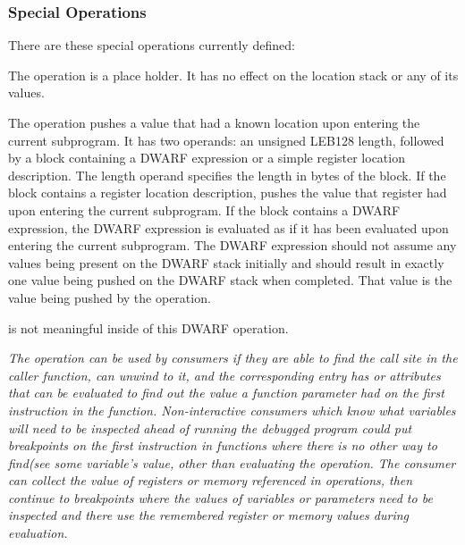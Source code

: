 \subsubsection{Special Operations}
\label{chap:specialoperations}
There 
are these special operations currently defined:
\begin{enumerate}[1. ]
\itembfnl{\DWOPnopNAME}
The \DWOPnopTARG{} operation is a place holder. It has no effect
on the location stack or any of its values.

\itembfnl{\DWOPentryvalueNAME}
The \DWOPentryvalueTARG{} operation pushes a value that had a known location
upon entering the current subprogram.  It has two operands: an 
unsigned LEB128 length, followed by 
a block containing a DWARF expression or
a simple register location description.  The length operand specifies the length
in bytes of the block.  If the block contains a register location
description, \DWOPentryvalueNAME{} pushes the value that register had upon
entering the current subprogram.  If the block contains a DWARF expression,
the DWARF expression is evaluated as if it has been evaluated upon entering
the current subprogram.  The DWARF expression should not assume any values
being present on the DWARF stack initially and should result in exactly one
value being pushed on the DWARF stack when completed.  That value is the value
being pushed by the \DWOPentryvalueNAME{} operation.  

\DWOPpushobjectaddress{} is not meaningful inside of this DWARF operation.

\textit{The \DWOPentryvalueNAME{} operation can be used by consumers if they are able
to find the call site in the caller function, can unwind to it, and the corresponding
\DWTAGcallsiteparameter{} entry has \DWATcallvalue{} or
\DWATcalldatavalue{} attributes that can be evaluated to find out the
value a function parameter had on the first instruction in the function.
Non-interactive consumers which know what variables will need to be
inspected ahead of running the debugged program could put breakpoints
on the first instruction in functions where there is no other way to find(see 
some variable's value, other than evaluating the \DWOPentryvalueNAME{} 
operation.  The consumer can collect the value of registers or 
memory referenced in
\DWOPentryvalueNAME{} operations, then continue to breakpoints where the values
of variables or parameters need to be inspected and there use the remembered
register or memory values during \DWOPentryvalueNAME{} evaluation.
}

\end{enumerate}

